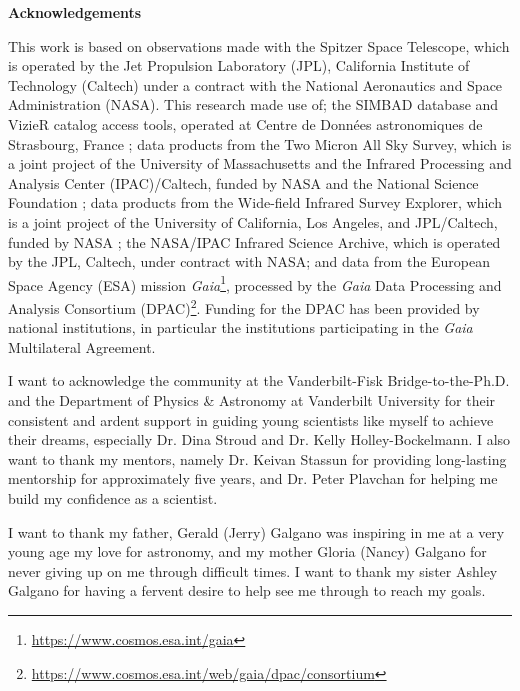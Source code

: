 {}

\noindent \textbf{Acknowledgements}


This work is based on observations made with the Spitzer Space Telescope, which is operated by the Jet Propulsion Laboratory (JPL), California Institute of Technology (Caltech) under a contract with the National Aeronautics and Space Administration (NASA). This research made use of; the SIMBAD database and VizieR catalog access tools, operated at Centre de Donn\'ees astronomiques de Strasbourg, France \citep{VIZIER}; data products from the Two Micron All Sky Survey, which is a joint project of the University of Massachusetts and the Infrared Processing and Analysis Center (IPAC)/Caltech, funded by NASA and the National Science Foundation \citep{2MASS}; data products from the Wide-field Infrared Survey Explorer, which is a joint project of the University of California, Los Angeles, and JPL/Caltech, funded by NASA \citep{WISE}; the NASA/IPAC Infrared Science Archive, which is operated by the JPL, Caltech, under contract with NASA; and data from the European Space Agency (ESA) mission {\it Gaia}\footnote{\url{https://www.cosmos.esa.int/gaia}}, processed by the {\it Gaia} Data Processing and Analysis Consortium (DPAC)\footnote{ \url{https://www.cosmos.esa.int/web/gaia/dpac/consortium}}. Funding for the DPAC has been provided by national institutions, in particular the institutions participating in the {\it Gaia} Multilateral Agreement.

I want to acknowledge the community at the Vanderbilt-Fisk Bridge-to-the-Ph.D. and the Department of Physics \& Astronomy at Vanderbilt University for their consistent and ardent support in guiding young scientists like myself to achieve their dreams, especially Dr. Dina Stroud and Dr. Kelly Holley-Bockelmann.  I also want to thank my mentors, namely Dr. Keivan Stassun for providing long-lasting mentorship for approximately five years, and Dr. Peter Plavchan for helping me build my confidence as a scientist.

I want to thank my father, Gerald (Jerry) Galgano was inspiring in me at a very young age my love for astronomy, and my mother Gloria (Nancy) Galgano for never giving up on me through difficult times. I want to thank my sister Ashley Galgano for having a fervent desire to help see me through to reach my goals.